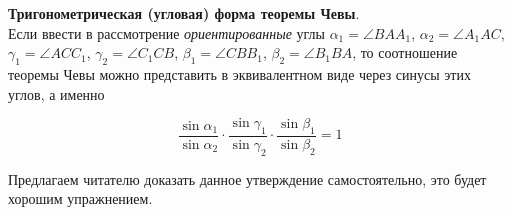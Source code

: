 \documentclass[14pt]{extarticle}
\theoremstyle{definition}
\theoremstyle{theorem}
\begin{document}





\begin{figure}
	\vspace{-1cm}
    
\end{figure}

\noindent \textbf{\small Тригонометрическая (угловая) форма теоремы Чевы}.\\
Если ввести в рассмотрение \textit{ориентированные} углы $\alpha_1 = \angle BAA_1$, 
$\alpha_2 = \angle A_1AC$, $\gamma_1 = \angle ACC_1$, $\gamma_2 = \angle C_1CB$,
$\beta_1 = \angle CBB_1$, $\beta_2 = \angle B_1BA$, то соотношение теоремы
Чевы можно представить в эквивалентном виде через синусы этих углов, а именно


{\setlength{\mathindent}{2.5cm}
\begin{equation*}
\dfrac{\sin \alpha_1}{\sin \alpha_2} \cdot 
	\dfrac{\sin \gamma_1}{\sin \gamma_2} 
\cdot \dfrac{\sin \beta_1}{\sin \beta_2} = 1 
\end{equation*}}
	


Предлагаем читателю доказать данное  утверждение самостоятельно, это 
будет хорошим упражнением.
\end{document}
